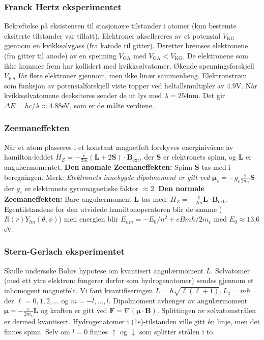 \documentclass[a4paper, norsk, 8pt]{article}
\begin{document}
\begin{multicols*}{3}
\subsubsection*{\scriptsize Franck Hertz eksperimentet} 
Bekreftelse på eksistensen til stasjonære tilstander i atomer (kun bestemte eksiterte tilstander var tillatt). Elektroner aksellereres av et potensial $V_{\mbox{KG}}$ gjennom en kvikksølvgass (fra katode til gitter). Deretter bremses elektronene (fra gitter til anode) av en spenning $V_{\mbox{GA}}$ med $V_{\mbox{GA}}<V_{\mbox{KG}}$. De elektronene som ikke kommer frem har kollidert med kvikksølvatomer. Økende spenningsforskjell $V_{\mbox{KA}}$ får flere elektroner gjennom, men ikke linær sammenheng. Elektronstrøm som funksjon av potensialforskjell viste topper ved heltallsmultipler av $4.9$V. Når kvikksølvatomene deeksiteres sender de ut lys med $\lambda=254$nm. Det gir $\Delta E =hc/\lambda \approx 4.88$eV, som er de målte verdiene.

\subsubsection*{\scriptsize Zeemaneffekten}
Når et atom plasseres i et konstant magnetfelt forskyves energinivåene av hamilton-leddet $H_Z=-\frac{e}{2m}(\mathbf{L}+2\mathbf{S})\cdot\mathbf{B}_{\mbox{ext}}$, der $\mathbf{S}$ er elektronets spinn, og $\mathbf{L}$ er angulærmomentet. \textbf{Den anomale Zeemaneffekten:} Spinn $\mathbf{S}$ tas med i beregningen. Merk: \textit{Elektronets innebygde dipolmoment er gitt ved} $\mathbf{\mu}_s=-g_e\frac{e}{2m_e}\mathbf{S}$ der $g_e$ er elektronets gyromagnetiske faktor $\approx 2$. \textbf{Den normale Zeemaneffekten:} Bare angulærmoment $\mathbf{L}$ tas med: $H_Z=-\frac{e}{2m}\mathbf{L}\cdot\mathbf{B}_{\mbox{ext}}$. Egentilstandene for den utvidede hamiltonoperatoren blir de samme ($R(r)Y_{lm}(\theta,\phi)$) men energien blir $E_{nm}=-E_0/n^2+eBm\hbar/2m_e$ med $E_0\approx13.6$eV.

\subsubsection*{\scriptsize Stern-Gerlach eksperimentet}
Skulle undersøke Bohrs hypotese om kvantisert angulærmoment $L$. Sølvatomer (med ett ytre elektron: fungerer derfor som hydrogenatomer) sendes gjennom et inhomogent magnetfelt. Vi fant kvantifiseringen $L=\hbar\sqrt{\ell(\ell+1)},L_z=m\hbar$ der $\ell=0,1,2,...$ og $m=-l,...,l$. Dipolmoment avhenger av angulærmoment $\mathbf{\mu}=-\frac{e}{2m_e}\mathbf{L}$ og kraften er gitt ved $\mathbf{F}=\nabla (\mathbf{\mu}\cdot\mathbf{B})$. Splittingen av sølvatomstrålen er dermed kvantisert. Hydrogenatomer i (1s)-tilstanden ville gitt én linje, men det finnes spinn. Selv om $l=0$ finnes $\uparrow$ og $\downarrow$ som splitter strålen i to.


\end{multicols*}
\end{document}
